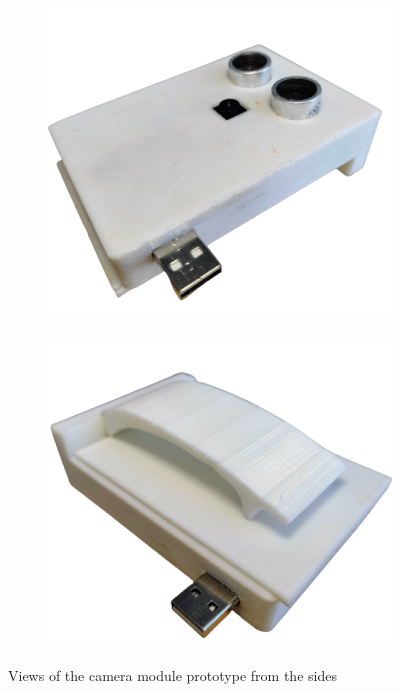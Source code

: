 \begin{figure}[H]
  \centering
	\begin{subfigure}[b]{0.45\textwidth}
    \centering
    \includegraphics[width=\textwidth]{img/Chap5/Prototype_View_side_1.png}
  \end{subfigure}
  \hfill
	\begin{subfigure}[b]{0.45\textwidth}
    \centering
    \includegraphics[width=\textwidth]{img/Chap5/Prototype_View_side_2.png}
  \end{subfigure}
	\caption{Views of the camera module prototype from the sides}
\end{figure}


